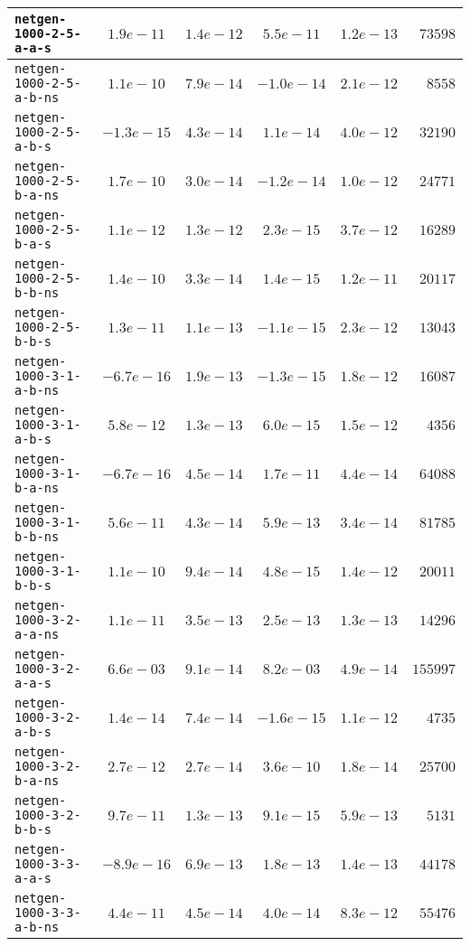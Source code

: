 \begin{center}
\begin{longtable}{|l || c | c | c | c | r|}
\hline
\texttt{netgen-1000-2-5-a-a-s} & $1.9e-11$ & $1.4e-12$ & $5.5e-11$ & $1.2e-13$ & $73598$ \\
\hline
\texttt{netgen-1000-2-5-a-b-ns} & $1.1e-10$ & $7.9e-14$ & $-1.0e-14$ & $2.1e-12$ & $8558$ \\
\hline
\texttt{netgen-1000-2-5-a-b-s} & $-1.3e-15$ & $4.3e-14$ & $1.1e-14$ & $4.0e-12$ & $32190$ \\
\hline
\texttt{netgen-1000-2-5-b-a-ns} & $1.7e-10$ & $3.0e-14$ & $-1.2e-14$ & $1.0e-12$ & $24771$ \\
\hline
\texttt{netgen-1000-2-5-b-a-s} & $1.1e-12$ & $1.3e-12$ & $2.3e-15$ & $3.7e-12$ & $16289$ \\
\hline
\texttt{netgen-1000-2-5-b-b-ns} & $1.4e-10$ & $3.3e-14$ & $1.4e-15$ & $1.2e-11$ & $20117$ \\
\hline
\texttt{netgen-1000-2-5-b-b-s} & $1.3e-11$ & $1.1e-13$ & $-1.1e-15$ & $2.3e-12$ & $13043$ \\
\hline
\texttt{netgen-1000-3-1-a-b-ns} & $-6.7e-16$ & $1.9e-13$ & $-1.3e-15$ & $1.8e-12$ & $16087$ \\
\hline
\texttt{netgen-1000-3-1-a-b-s} & $5.8e-12$ & $1.3e-13$ & $6.0e-15$ & $1.5e-12$ & $4356$ \\
\hline
\texttt{netgen-1000-3-1-b-a-ns} & $-6.7e-16$ & $4.5e-14$ & $1.7e-11$ & $4.4e-14$ & $64088$ \\
\hline
\texttt{netgen-1000-3-1-b-b-ns} & $5.6e-11$ & $4.3e-14$ & $5.9e-13$ & $3.4e-14$ & $81785$ \\
\hline
\texttt{netgen-1000-3-1-b-b-s} & $1.1e-10$ & $9.4e-14$ & $4.8e-15$ & $1.4e-12$ & $20011$ \\
\hline
\texttt{netgen-1000-3-2-a-a-ns} & $1.1e-11$ & $3.5e-13$ & $2.5e-13$ & $1.3e-13$ & $14296$ \\
\hline
\texttt{netgen-1000-3-2-a-a-s} & $6.6e-03$ & $9.1e-14$ & $8.2e-03$ & $4.9e-14$ & $155997$ \\
\hline
\texttt{netgen-1000-3-2-a-b-s} & $1.4e-14$ & $7.4e-14$ & $-1.6e-15$ & $1.1e-12$ & $4735$ \\
\hline
\texttt{netgen-1000-3-2-b-a-ns} & $2.7e-12$ & $2.7e-14$ & $3.6e-10$ & $1.8e-14$ & $25700$ \\
\hline
\texttt{netgen-1000-3-2-b-b-s} & $9.7e-11$ & $1.3e-13$ & $9.1e-15$ & $5.9e-13$ & $5131$ \\
\hline
\texttt{netgen-1000-3-3-a-a-s} & $-8.9e-16$ & $6.9e-13$ & $1.8e-13$ & $1.4e-13$ & $44178$ \\
\hline
\texttt{netgen-1000-3-3-a-b-ns} & $4.4e-11$ & $4.5e-14$ & $4.0e-14$ & $8.3e-12$ & $55476$ \\

\end{longtable}
\end{center}
